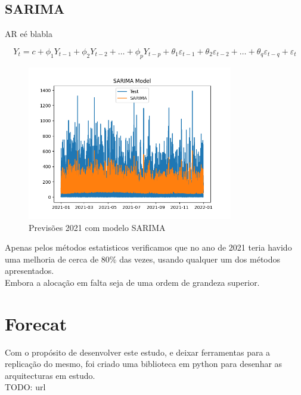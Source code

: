 \subsection{SARIMA}

AR eé blabla

\begin{equation} \label{eq:SARIMA} Y_t = c + \phi_1 Y_{t-1} + \phi_2 Y_{t-2} + \dots + \phi_p Y_{t-p} + \theta_1 \varepsilon_{t-1} + \theta_2 \varepsilon_{t-2} + \dots + \theta_q \varepsilon_{t-q} + \varepsilon_t \end{equation}

\begin{figure}[H]
    \centering
    \includegraphics[width=0.8\textwidth]{../plots/SARIMA_model.png}
    \caption{Previsões 2021 com modelo SARIMA}
    \label{fig:SARIMA_model}
\end{figure}

\resizebox{\linewidth}{!}{} %


Apenas pelos métodos estatisticos verificamos que no ano de 2021 teria havido uma melhoria de cerca de 80\% das vezes, usando qualquer um dos métodos apresentados.\\
Embora a alocação em falta seja de uma ordem de grandeza superior.\\


\section{Forecat  \label{se:forecat}}


Com o propósito de desenvolver este estudo, e deixar ferramentas para a replicação do mesmo, foi criado uma biblioteca em python para desenhar as arquitecturas em estudo.\\
TODO: url

